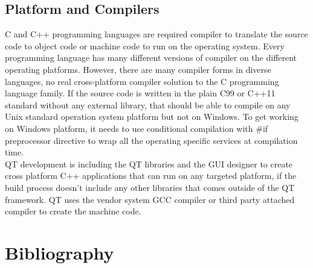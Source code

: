 \documentclass[12pt]{article}
\begin{document}
\subsection{Platform and Compilers}
C and C++ programming languages are required compiler to translate the source code to object code or machine code to run on the operating system. Every programming language has many different versions of compiler on the different operating platforms. However, there are many compiler forms in  diverse languages, no real cross-platform compiler solution to the C programming language family. If the source code is written in the plain C99 or C++11 standard without any external library, that should be able to compile on any Unix standard operation system platform but not on Windows. To get working on Windows platform, it needs to use conditional compilation with \#if preprocessor directive to wrap all the operating specific services at compilation time.\\ 

QT development is including the QT libraries and the GUI designer to create cross platform C++ applications that can run on any targeted platform, if the build process doesn't include any other libraries that comes outside of the QT framework. QT uses the vendor system GCC compiler or third party attached compiler to create the machine code.

\newpage
\section{Bibliography}
\begin{center}



\end{center}
\end{document}
